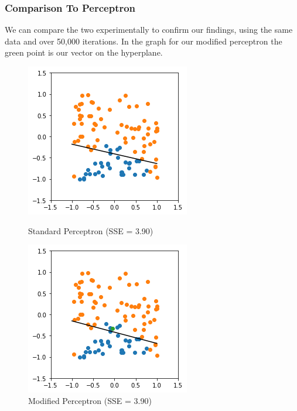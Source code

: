 \documentclass[notitlepage]{report}
\theoremstyle{definition}
\begin{document}
\subsubsection{Comparison To Perceptron}
We can compare the two experimentally to confirm our findings, using the same data and over 50,000 iterations. In the graph for our modified perceptron the green point is our vector on the hyperplane.


\begin{figure}[H]
\centering
  \begin{minipage}[b]{0.4\textwidth}
    \includegraphics[width=\textwidth]{Standard-Perceptron.png}
    \caption{Standard Perceptron (SSE = 3.90)}
  \end{minipage}
  \hfill
  \begin{minipage}[b]{0.4\textwidth}
    \includegraphics[width=\textwidth]{Modified-Perceptron-(Normal-Point).png}
    \caption{Modified Perceptron (SSE = 3.90)}
  \end{minipage}
\end{figure}
\end{document}

